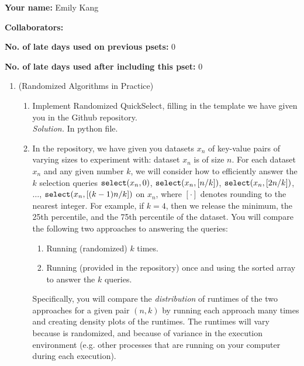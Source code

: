 \documentclass[11pt]{article}
\begin{document}

\textbf{Your name: }Emily Kang

\textbf{Collaborators: }

\textbf{No. of late days used on previous psets: } 0 

\textbf{No. of late days used after including this pset: } 0 

\begin{enumerate}
    \item (Randomized Algorithms in Practice)  
    \begin{enumerate}
        \item Implement Randomized QuickSelect, filling in the template we have given you in the Github repository. \\
        \textit{Solution.} In python file.
        \item 
        In the repository, we have given you datasets $x_n$ of key-value pairs of varying sizes to experiment with: dataset $x_n$ is of size $n$.  For each dataset $x_n$ and any given number $k$, we will consider how to efficiently answer the $k$ selection queries
        $\texttt{select}(x_n,0)$, $\texttt{select}(x_n,[n/k])$, $\texttt{select}(x_n,[2n/k])$, $\ldots$, $\texttt{select}(x_n,[(k-1)n/k])$ on $x_n$, where $[\cdot]$ denotes rounding to the nearest integer. For example, if $k=4$, then we release the minimum, the 25th percentile, and the 75th percentile of the dataset.  You will compare the following two approaches to answering the queries:
        
        \begin{enumerate}
            \item Running (randomized) \QuickSelect{} $k$ times.
            \item Running \MergeSort{} (provided in the repository) once and using the sorted array to answer the $k$ queries.
        \end{enumerate}
        Specifically, you will compare the {\em distribution} of runtimes of the two approaches for a given pair $(n,k)$ by running each approach many times and creating density plots of the runtimes.  The runtimes will vary because \QuickSelect{}  is randomized, and because of variance in the execution environment (e.g. other processes that are running on your computer during each execution). \vspace{1.5mm} 
        

\end{enumerate}
\end{enumerate}
\end{document}
